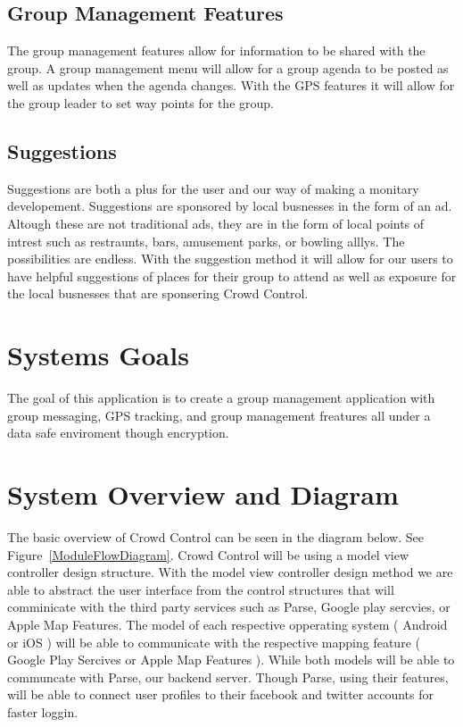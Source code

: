 \subsection{Group Management Features}
The group management features allow for information to be shared with the group. A group management menu will allow for a group agenda to be posted as well as updates when the agenda changes. With the GPS features it will allow for the group leader to set way points for the group.  

\subsection{Suggestions}
Suggestions are both a plus for the user and our way of making a monitary developement. Suggestions are sponsored by local busnesses in the form of an ad. Altough these are not traditional ads, they are in the form of local points of intrest such as restraunts, bars, amusement parks, or bowling alllys. The possibilities are endless. With the suggestion method it will allow for our users to have helpful suggestions of places for their group to attend as well as exposure for the local busnesses that are sponsering Crowd Control.

\section{Systems Goals}
The goal of this application is to create a group management application with group messaging, GPS tracking, and group management freatures all under a data safe enviroment though encryption.

\section{System Overview and Diagram}
The basic overview of Crowd Control can be seen in the diagram below. See Figure~\ref{ModuleFlowDiagram}. Crowd Control will be using a model view controller design structure. With the model view controller design method we are able to abstract the user interface from the control structures that will comminicate with the third party services such as Parse, Google play sercvies, or Apple Map Features. The model of each respective opperating system ( Android or iOS ) will be able to communicate with the respective mapping feature ( Google Play Sercives or Apple Map Features ). While both models will be able to communcate with Parse, our backend server. Though Parse, using their features, will be able to connect user profiles to their facebook and twitter accounts for faster loggin.

